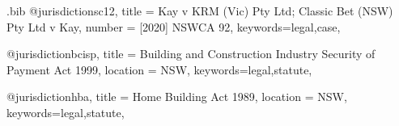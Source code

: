 

\begin{filecontents*}{\jobname.bib}
@jurisdiction{sc12,
title = {Kay v KRM (Vic) Pty Ltd; Classic Bet (NSW) Pty Ltd v Kay},
number = {[2020] NSWCA 92},
keywords={legal,case},
}

@jurisdiction{bcisp,
title = {Building and Construction Industry Security of Payment Act 1999},
location = {NSW},
keywords={legal,statute},
}

@jurisdiction{hba,
title = {Home Building Act 1989},
location = {NSW},
keywords={legal,statute},
}

\end{filecontents*}



\documentclass[12pt,varwidth,border=6pt]{standalone}
\newcommand\rulesep{\rule{0.4\textwidth}{.4pt}}
\usepackage[table]{xcolor}
\pagecolor{blue!3}
\usepackage{fontspec}
\setmainfont{Noto Serif}




\newcommand\abibname{ext-authortitle-ibid}
\newcommand\abibstyle{style=\abibname}
\usepackage[
	\abibstyle , 
	indexing=cite,
	citetracker=true,
	ibidtracker=true,
	pagetracker=true,
	idemtracker=true,
	opcittracker=true,
	loccittracker=true,
	autocite=footnote,
		]{biblatex}




				





